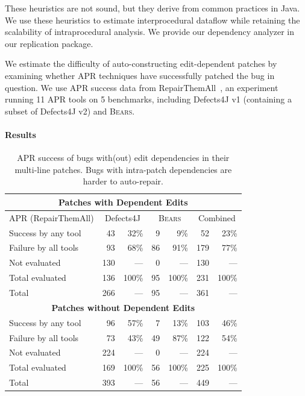 \documentclass[10pt, conference]{IEEEtran}
\newcommand\bears{\textsc{Bears}\xspace}
\begin{document}
These heuristics are not sound, but they derive from common 
practices in Java. We use these heuristics to estimate interprocedural 
dataflow while retaining the scalability of intraprocedural analysis.
We provide our dependency analyzer in our replication package.

We estimate the difficulty of auto-constructing edit-dependent patches 
by examining whether APR techniques have successfully patched the
bug in question. We use APR success data from 
RepairThemAll~\cite{durieux-repair-them-all}, an experiment 
running 11 APR tools on 5 benchmarks, including Defects4J v1
(containing a subset of Defects4J v2) and \bears.

\paragraph{Results}

\begin{table}
{\begin{center}
	\begin{tabular}{l  rr  rr  rr}
		\toprule
		\multicolumn{7}{c}{\textbf{Patches with Dependent Edits}} \\
		\midrule
		APR (RepairThemAll) & \multicolumn{2}{c}{Defects4J} & \multicolumn{2}{c}{\bears} & \multicolumn{2}{c}{Combined} \\
		\midrule
		Success by any tool & 43 & 32\% & 9 & 9\% & 52 & 23\% \\
		Failure by all tools & 93 & 68\% & 86 & 91\% & 179 & 77\% \\
		Not evaluated & 130 & --- & 0 & --- & 130 & --- \\
		\midrule
		Total evaluated & 136 & 100\% & 95 & 100\% & 231 & 100\% \\
		Total & 266 & --- & 95 & --- & 361 & --- \\
		\midrule
		\multicolumn{7}{c}{\textbf{Patches without Dependent Edits}} \\
		\midrule
		Success by any tool & 96 & 57\% & 7 & 13\% & 103 & 46\% \\
		Failure by all tools & 73 & 43\% & 49 & 87\% & 122 & 54\% \\
		Not evaluated & 224 & --- & 0 & --- & 224 & --- \\
		\midrule
		Total evaluated & 169 & 100\% & 56 & 100\% & 225 & 100\% \\
		Total & 393 & --- & 56 & --- & 449 & --- \\
		\bottomrule
	\end{tabular}
 \end{center}
}
	\caption{APR success of 
	bugs with(out) edit dependencies in their multi-line patches. 
	Bugs with intra-patch dependencies are harder to auto-repair. }
	\label{tab:dependency-repair-contingency-table}
\end{table}
\end{document}
